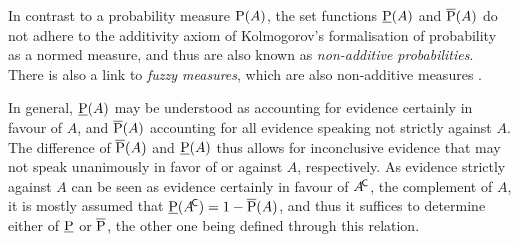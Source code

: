 In contrast to a probability measure $\operatorname{P}(A)$,
the set functions $\underline{\operatorname{P}}(A)$ and $\overline{\operatorname{P}}(A)$ do not adhere
to the additivity axiom of Kolmogorov's \parencite*{1933:kolmogorov}
formalisation of probability as a normed measure,
and thus are also known as \emph{non-additive probabilities}.
There is also a link to \emph{fuzzy measures}, which are also non-additive measures
\parencite[see, e.g.,][]{1997:denneberg}.

In general, $\underline{\operatorname{P}}(A)$ may be understood as accounting for evidence certainly in favour of $A$,
and $\overline{\operatorname{P}}(A)$ accounting for all evidence speaking not strictly against $A$.
The difference of $\overline{\operatorname{P}}(A)$ and $\underline{\operatorname{P}}(A)$ thus allows for inconclusive evidence
that may not speak unanimously in favor of or against $A$, respectively.
As evidence strictly against $A$ can be seen as evidence certainly in favour of $A^{{\mbox{\!\scriptsize\textsf{C}}}}$,
the complement of $A$,
it is mostly assumed that $\underline{\operatorname{P}}(A^{{\mbox{\!\scriptsize\textsf{C}}}}) = 1 - \overline{\operatorname{P}}(A)$,
and thus it suffices to determine either of $\underline{\operatorname{P}}$ or $\overline{\operatorname{P}}$,
the other one being defined through this relation.


